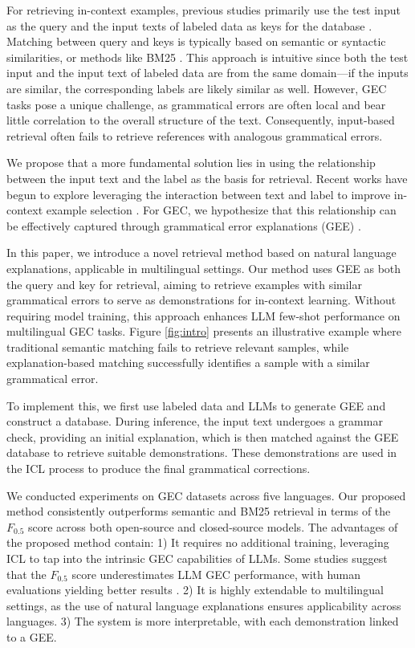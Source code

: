For retrieving in-context examples, previous studies primarily use the test input as the query and the input texts of labeled data as keys for the database \cite{retrieve-demonstration-survey}. Matching between query and keys is typically based on semantic or syntactic similarities, or methods like BM25 \cite{hongjin2022selective, tang-etal-2024-ungrammatical, robertson2009probabilistic}. This approach is intuitive since both the test input and the input text of labeled data are from the same domain—if the inputs are similar, the corresponding labels are likely similar as well. However, GEC tasks pose a unique challenge, as grammatical errors are often local and bear little correlation to the overall structure of the text. Consequently, input-based retrieval often fails to retrieve references with analogous grammatical errors.

We propose that a more fundamental solution lies in using the relationship between the input text and the label as the basis for retrieval. Recent works have begun to explore leveraging the interaction between text and label to improve in-context example selection \cite{sun2024retrieved-by-mistake}. For GEC, we hypothesize that this relationship can be effectively captured through grammatical error explanations (GEE) \cite{song-etal-2024-gee}.

In this paper, we introduce a novel retrieval method based on natural language explanations, applicable in multilingual settings. Our method uses GEE as both the query and key for retrieval, aiming to retrieve examples with similar grammatical errors to serve as demonstrations for in-context learning. Without requiring model training, this approach enhances LLM few-shot performance on multilingual GEC tasks. Figure \ref{fig:intro} presents an illustrative example where traditional semantic matching fails to retrieve relevant samples, while explanation-based matching successfully identifies a sample with a similar grammatical error.

To implement this, we first use labeled data and LLMs to generate GEE and construct a database. During inference, the input text undergoes a grammar check, providing an initial explanation, which is then matched against the GEE database to retrieve suitable demonstrations. These demonstrations are used in the ICL process to produce the final grammatical corrections.

We conducted experiments on GEC datasets across five languages. Our proposed method consistently outperforms semantic and BM25 retrieval in terms of the $F_{0.5}$ score across both open-source and closed-source models. The advantages of the proposed method contain: 1) It requires no additional training, leveraging ICL to tap into the intrinsic GEC capabilities of LLMs. Some studies suggest that the $F_{0.5}$ score underestimates LLM GEC performance, with human evaluations yielding better results \cite{coyne2023analyzing}. 2) It is highly extendable to multilingual settings, as the use of natural language explanations ensures applicability across languages. 3) The system is more interpretable, with each demonstration linked to a GEE.

